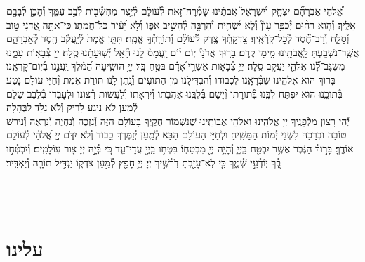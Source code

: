\documentclass[twoside, openany, parskip=half, 11pt]{book}
\begin{document}
\begin{sometimes}
%
אֱ֠לֹהֵי אַבְרָהָ֞ם יִצְחָ֤ק וְ֯יִשְׂרָאֵל֙ אֲבֹתֵ֔ינוּ שָׁמְ֯רָה־זֹּ֣את לְ֯עוֹלָ֔ם לְ֯יֵ֥צֶר מַחְשְׁ֯ב֖וֹת לְ֯בַ֣ב עַמֶּ֑ךָ וְ֯הָכֵ֥ן לְ֯בָבָ֖ם אֵלֶֽיךָ׃ וְ֯ה֤וּא
%
רַח֨וּם יְ֯כַפֵּ֥ר עָוֹן֘ וְ֯לֹ֢א יַ֫שְׁחִ֥ית וְ֯הִרְבָּ֣ה לְ֯הָשִׁ֣יב אַפּ֑וֹ וְ֯לֹ֣א יָ֝עִ֗יר כׇּל־חֲמָתֽוֹ׃ כִּֽי־אַתָּ֣ה
%
אֲ֭דֹנָי ט֣וֹב וְ֯סַלָּ֑ח וְ֯רַב־חֶ֝֗סֶד לְ֯כׇל־קֹֽרְ֯אֶֽיךָ׃ צִ֭דְקָֽתְ֯ךָ
%
צֶ֥דֶק לְ֯עוֹלָ֗ם וְ֯תוֹרָֽתְ֯ךָ֥ אֱמֶֽת׃ תִּתֵּ֤ן
%
אֱמֶת֙ לְ֯יַֽעֲקֹ֔ב חֶ֖סֶד לְ֯אַבְרָהָ֑ם אֲשֶֽׁר־נִשְׁבַּ֥עְתָּ לַֽאֲבֹתֵ֖ינוּ מִ֥ימֵי קֶֽדֶם׃ בָּר֥וּךְ
%
אֲדֹנָי֘ י֤וֹם י֗וֹם יַֽעֲמָס֫ לָ֥נוּ הָ֘אֵ֤ל יְ֯שֽׁוּעָתֵ֬נוּ סֶֽלָה׃ יְיָ֣
%
צְ֯בָא֣וֹת עִמָּ֑נוּ מִשְׂגָּב־לָ֝֗נוּ אֱלֹהֵ֖י יַעֲקֹ֣ב סֶֽלָה׃ יְיָ֥
%
צְ֯בָא֑וֹת אַשְׁרֵ֥י ֝אָדָ֗ם בֹּטֵ֥חַ בָּֽךְ׃ יְיָ֥
%
הוֹשִׁ֑יעָה הַ֝מֶּ֗לֶךְ יַֽעֲנֵ֥נוּ בְ֯יֽוֹם־קׇרְאֵֽנוּ׃ \\
בָּרוּךְ הוּא אֱלֹהֵֽינוּ שֶׁבְּ֯רָאָֽנוּ לִכְבוֹדוֹ וְ֯הִבְדִּילָֽנוּ מִן הַתּוֹעִים וְ֯נָֽתַן לָֽנוּ תּוֹרַת אֱמֶת וְ֯חַיֵּי עוֹלָם נָטַע בְּ֯תוֹכֵֽנוּ הוּא יִפְתַּח לִבֵּֽנוּ בְּ֯תוֹרָתוֹ וְ֯יָשֵׂם בְּ֯לִבֵּֽנוּ אַהֲבָתוֹ וְ֯יִרְאָתוֹ וְ֯לַעֲשׂוֹת רְ֯צוֹנוֹ וּלְעָבְדוֹ בְ֯לֵבָב שָׁלֵם לְ֯מַֽעַן לֹא נִיגַע לָרִיק וְ֯לֹא נֵלֵד לַבֶּהָלָה׃\\
יְ֯הִי רָצוֹן מִלְּ֯פָנֶֽיךָ יְיָ אֱלֹהֵֽינוּ וֵאלֹהֵי אֲבוֹתֵֽינוּ שֶׁנִּשְׁמוֹר חֻקֶּֽיךָ בָּעוֹלָם הַזֶּה וְ֯נִזְכֶּה וְ֯נִחְיֶה וְ֯נִרְאֶה וְ֯נִירַשׁ טוֹבָה וּבְרָכָה לִשְׁנֵי יְ֯מוֹת הַמָּשִֽׁיחַ וּלְחַיֵּי הָעוֹלָם הַבָּא׃ לְ֯מַ֤עַן יְ֯זַמֶּרְךָ֣ כָ֭בוֹד וְ֯לֹ֣א יִדֹּ֑ם יְיָ֥ אֱ֝לֹהַ֗י לְ֯עוֹלָ֣ם אוֹדֶֽךָּ׃ בָּר֣וּךְ֯ הַגֶּ֔בֶר אֲשֶׁ֥ר יִבְטַ֖ח בַּֽיְיָ֑ וְ֯הָיָ֥ה יְיָ֖ מִבְטַחֽוֹ׃ בִּטְח֥וּ
%
בַֽיְיָ֖ עֲדֵי־עַ֑ד כִּ֚י בְּ֯יָ֣הּ יְיָ֔ צ֖וּר עֽוֹלָמִֽים׃ וְ֯יִבְטְ֯ח֣וּ
%
בְ֭֯ךָ יֽוֹדְ֯עֵ֣י שְׁ֯מֶ֑ךָ כִּ֤י לֹֽא־עָזַ֖בְתָּ דֹֽרְ֯שֶׁ֣יךָ יְיָ׃ יְיָ֥
%
חָפֵ֖ץ לְ֯מַ֣עַן צִדְק֑וֹ יַגְדִּ֥יל תּוֹרָ֖ה וְ֯יַאְדִּֽיר׃

\end{sometimes}

\fullkaddish

\vfill

\\
\\

\clearpage
\section*{ עלינו }
\end{document}
